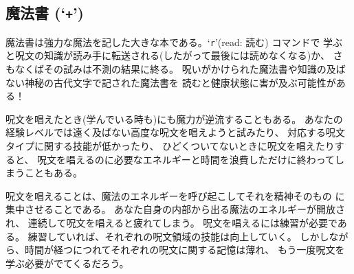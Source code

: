 \subsection*{魔法書 (`{\tt +}')}

魔法書は強力な魔法を記した大きな本である。`{\tt r}'(read: 読む) コマンドで
学ぶと呪文の知識が読み手に転送される(したがって最後には読めなくなる)か、
さもなくばその試みは不測の結果に終る。
呪いがかけられた魔法書や知識の及ばない神秘の古代文字で記された魔法書を
読むと健康状態に害が及ぶ可能性がある！

呪文を唱えたとき(学んでいる時も)にも魔力が逆流することもある。
あなたの経験レベルでは遠く及ばない高度な呪文を唱えようと試みたり、
対応する呪文タイプに関する技能が低かったり、
ひどくついてないときに呪文を唱えたりすると、
呪文を唱えるのに必要なエネルギーと時間を浪費しただけに終わってしまうこともある。

呪文を唱えることは、魔法のエネルギーを呼び起こしてそれを精神そのもの
に集中させることである。
あなた自身の内部から出る魔法のエネルギーが開放され、
連続して呪文を唱えると疲れてしまう。
呪文を唱えるには練習が必要である。
練習していれば、それぞれの呪文領域の技能は向上していく。
しかしながら、時間が経つにつれてそれぞれの呪文に関する記憶は薄れ、
もう一度呪文を学ぶ必要がでてくるだろう。

